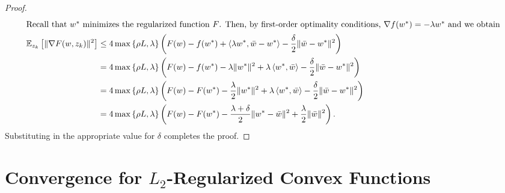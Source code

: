 \begin{proof}
\begin{align*}
       \intertext{Recall that \( w^*\) minimizes the regularized function \( F \). Then, by first-order optimality conditions, \( \nabla f(w^*) = - \lambda w^*\) and we obtain} 
       \mathbb{E}_{z_{k}}\left[\|\nabla F(w, z_{k})\|^2\right] &\leq 4 \max\left\{\rho L, \lambda\right\} \left(F(w) - f(w^*) + \left\langle\lambda w^*, \bar{w} - w^*\right\rangle - \frac{\delta}{2}\|\bar{w} - w^*\|^2 \right)\\
                                                     &= 4 \max\left\{\rho L, \lambda\right\} \left(F(w) - f(w^*) - \lambda \|w^*\|^2  + \lambda \left\langle w^*, \bar{w}\right\rangle - \frac{\delta}{2}\|\bar{w} - w^*\|^2\right)\\
                                                     &=  4 \max\left\{\rho L, \lambda\right\} \left(F(w) - F(w^*) - \frac{\lambda}{2} \|w^*\|^2 + \lambda \left\langle w^*, \bar{w}\right\rangle - \frac{\delta}{2}\|\bar{w} - w^*\|^2\right)\\
                                                     &= 4 \max\left\{\rho L, \lambda\right\} \left(F(w) - F(w^*) - \frac{\lambda + \delta}{2} \|w^* - \bar{w}\|^2 + \frac{\lambda}{2} \|\bar{w}\|^2\right).
   \end{align*} 
   Substituting in the appropriate value for \( \delta \) completes the proof.
\end{proof}

\section{Convergence for \( L_2 \)-Regularized Convex Functions}~\label{app:regularized-convex}

